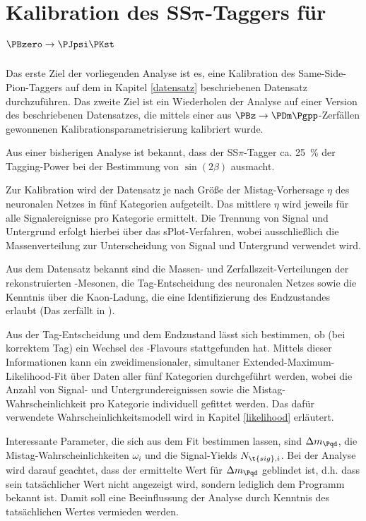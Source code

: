 \section{\texorpdfstring{Kalibration des SS$\mathbf{\pi}$-Taggers für $\mathbf{\PBzero \to \PJpsi \PKst}$}{Kalibration des SSpi-Taggers für B0 -> JpsiKst}}

Das erste Ziel der vorliegenden Analyse ist es, eine Kalibration des Same-Side-Pion-Taggers auf dem in Kapitel \ref{datensatz} beschriebenen Datensatz durchzuführen.
Das zweite Ziel ist ein Wiederholen der Analyse auf einer Version des beschriebenen Datensatzes, die mittels einer aus $\PBz \to \PDm\Pgpp$-Zerfällen gewonnenen Kalibrationsparametrisierung kalibriert wurde.

Aus einer bisherigen Analyse ist bekannt, dass der SS$π$-Tagger ca. \SI{25}{\percent} der Tagging-Power bei der Bestimmung von $\sin(2β)$ ausmacht.

Zur Kalibration wird der Datensatz je nach Größe der Mistag-Vorhersage $η$ des neuronalen Netzes in fünf Kategorien aufgeteilt.
Das mittlere $η$ wird jeweils für alle Signalereignisse pro Kategorie ermittelt.
Die Trennung von Signal und Untergrund erfolgt hierbei über das sPlot-Verfahren\cite{splot}, wobei ausschließlich die Massenverteilung zur Unterscheidung von Signal und Untergrund verwendet wird.

Aus dem Datensatz bekannt sind die Massen- und Zerfallszeit-Verteilungen der rekonstruierten \PB-Mesonen, die Tag-Entscheidung des neuronalen Netzes sowie die Kenntnis über die Kaon-Ladung, die eine Identifizierung des Endzustandes erlaubt (Das \PKst zerfällt in \PKp\Pgpm).

Aus der Tag-Entscheidung und dem Endzustand lässt sich bestimmen, ob (bei korrektem Tag) ein Wechsel des \Pqb-Flavours stattgefunden hat.
Mittels dieser Informationen kann ein zweidimensionaler, simultaner Extended-Maximum-Likelihood-Fit über Daten aller fünf Kategorien durchgeführt werden, wobei die Anzahl von Signal- und Untergrundereignissen sowie die Mistag-Wahrscheinlichkeit pro Kategorie individuell gefittet werden.
Das dafür verwendete Wahrscheinlichkeitsmodell wird in Kapitel \ref{likelihood} erläutert.

Interessante Parameter, die sich aus dem Fit bestimmen lassen, sind $\difference{m_{\Pqd}}$, die Mistag-Wahrscheinlichkeiten $ω_i$ und die Signal-Yields $N_{\t{sig},i}$.
Bei der Analyse wird darauf geachtet, dass der ermittelte Wert für $\difference{m_{\Pqd}}$ geblindet ist, d.h. dass sein tatsächlicher Wert nicht angezeigt wird, sondern lediglich dem Programm bekannt ist.
Damit soll eine Beeinflussung der Analyse durch Kenntnis des tatsächlichen Wertes vermieden werden.


